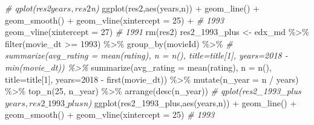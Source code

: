 \documentclass[
]{article}
\newenvironment{Shaded}{}{}
\newcommand{\AttributeTok}[1]{\textcolor[rgb]{0.49,0.56,0.16}{#1}}
\newcommand{\CommentTok}[1]{\textcolor[rgb]{0.38,0.63,0.69}{\textit{#1}}}
\newcommand{\DecValTok}[1]{\textcolor[rgb]{0.25,0.63,0.44}{#1}}
\newcommand{\FunctionTok}[1]{\textcolor[rgb]{0.02,0.16,0.49}{#1}}
\newcommand{\NormalTok}[1]{#1}
\newcommand{\OtherTok}[1]{\textcolor[rgb]{0.00,0.44,0.13}{#1}}
\newcommand{\SpecialCharTok}[1]{\textcolor[rgb]{0.25,0.44,0.63}{#1}}
\begin{document}
\begin{Shaded}
\begin{Highlighting}[]
\CommentTok{\# qplot(res2$years,res2$n)}
\FunctionTok{ggplot}\NormalTok{(res2,}\FunctionTok{aes}\NormalTok{(years,n)) }\SpecialCharTok{+} 
  \FunctionTok{geom\_line}\NormalTok{() }\SpecialCharTok{+} 
  \FunctionTok{geom\_smooth}\NormalTok{() }\SpecialCharTok{+} 
  \FunctionTok{geom\_vline}\NormalTok{(}\AttributeTok{xintercept =} \DecValTok{25}\NormalTok{) }\SpecialCharTok{+} \CommentTok{\# 1993}
  \FunctionTok{geom\_vline}\NormalTok{(}\AttributeTok{xintercept =} \DecValTok{27}\NormalTok{) }\CommentTok{\# 1991}
\FunctionTok{rm}\NormalTok{(res2)}
\NormalTok{res2\_1993\_plus }\OtherTok{\textless{}{-}}\NormalTok{ edx\_md }\SpecialCharTok{\%\textgreater{}\%}
  \FunctionTok{filter}\NormalTok{(movie\_dt }\SpecialCharTok{\textgreater{}=} \DecValTok{1993}\NormalTok{) }\SpecialCharTok{\%\textgreater{}\%}
  \FunctionTok{group\_by}\NormalTok{(movieId) }\SpecialCharTok{\%\textgreater{}\%}
  \CommentTok{\# summarize(avg\_rating = mean(rating), n = n(), title=title[1], years=2018 {-} min(movie\_dt)) \%\textgreater{}\% }
  \FunctionTok{summarize}\NormalTok{(}\AttributeTok{avg\_rating =} \FunctionTok{mean}\NormalTok{(rating), }\AttributeTok{n =} \FunctionTok{n}\NormalTok{(), }\AttributeTok{title=}\NormalTok{title[}\DecValTok{1}\NormalTok{], }\AttributeTok{years=}\DecValTok{2018} \SpecialCharTok{{-}} \FunctionTok{first}\NormalTok{(movie\_dt)) }\SpecialCharTok{\%\textgreater{}\%} 
  \FunctionTok{mutate}\NormalTok{(}\AttributeTok{n\_year =}\NormalTok{ n }\SpecialCharTok{/}\NormalTok{ years) }\SpecialCharTok{\%\textgreater{}\%}
  \FunctionTok{top\_n}\NormalTok{(}\DecValTok{25}\NormalTok{, n\_year) }\SpecialCharTok{\%\textgreater{}\%}
  \FunctionTok{arrange}\NormalTok{(}\FunctionTok{desc}\NormalTok{(n\_year))}
\CommentTok{\# qplot(res2\_1993\_plus$years,res2\_1993\_plus$n)}
\FunctionTok{ggplot}\NormalTok{(res2\_1993\_plus,}\FunctionTok{aes}\NormalTok{(years,n)) }\SpecialCharTok{+} 
  \FunctionTok{geom\_line}\NormalTok{() }\SpecialCharTok{+} 
  \FunctionTok{geom\_smooth}\NormalTok{() }\SpecialCharTok{+} 
  \FunctionTok{geom\_vline}\NormalTok{(}\AttributeTok{xintercept =} \DecValTok{25}\NormalTok{) }\CommentTok{\# 1993}


\end{Highlighting}
\end{Shaded}
\end{document}
